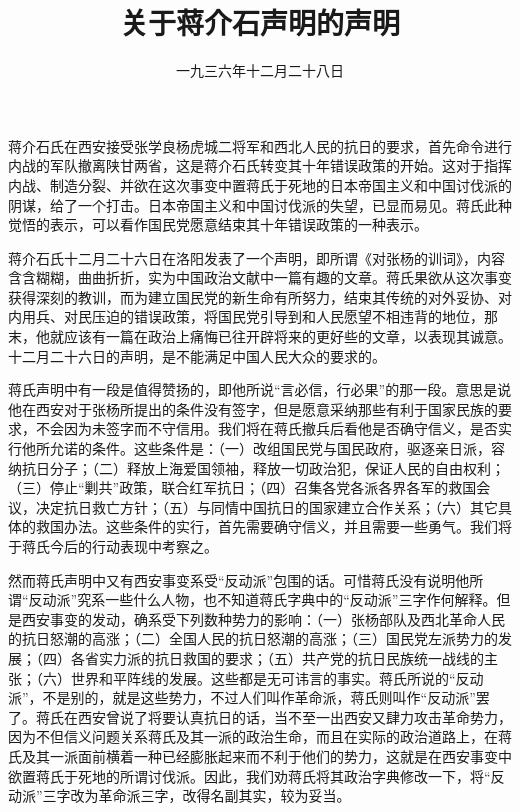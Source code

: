 
\title{关于蒋介石声明的声明}
\date{一九三六年十二月二十八日}
\maketitle


蒋介石氏在西安接受张学良杨虎城二将军和西北人民的抗日的要求，首先命令进行内战的军队撤离陕甘两省，这是蒋介石氏转变其十年错误政策的开始。这对于指挥内战、制造分裂、并欲在这次事变中置蒋氏于死地的日本帝国主义和中国讨伐派的阴谋，给了一个打击。日本帝国主义和中国讨伐派的失望，已显而易见。蒋氏此种觉悟的表示，可以看作国民党愿意结束其十年错误政策的一种表示。

蒋介石氏十二月二十六日在洛阳发表了一个声明，即所谓《对张杨的训词》，内容含含糊糊，曲曲折折，实为中国政治文献中一篇有趣的文章。蒋氏果欲从这次事变获得深刻的教训，而为建立国民党的新生命有所努力，结束其传统的对外妥协、对内用兵、对民压迫的错误政策，将国民党引导到和人民愿望不相违背的地位，那末，他就应该有一篇在政治上痛悔已往开辟将来的更好些的文章，以表现其诚意。十二月二十六日的声明，是不能满足中国人民大众的要求的。

蒋氏声明中有一段是值得赞扬的，即他所说“言必信，行必果”的那一段。意思是说他在西安对于张杨所提出的条件没有签字，但是愿意采纳那些有利于国家民族的要求，不会因为未签字而不守信用。我们将在蒋氏撤兵后看他是否确守信义，是否实行他所允诺的条件。这些条件是：（一）改组国民党与国民政府，驱逐亲日派，容纳抗日分子；（二）释放上海爱国领袖，释放一切政治犯，保证人民的自由权利；（三）停止“剿共”政策，联合红军抗日；（四）召集各党各派各界各军的救国会议，决定抗日救亡方针；（五）与同情中国抗日的国家建立合作关系；（六）其它具体的救国办法。这些条件的实行，首先需要确守信义，并且需要一些勇气。我们将于蒋氏今后的行动表现中考察之。

然而蒋氏声明中又有西安事变系受“反动派”包围的话。可惜蒋氏没有说明他所谓“反动派”究系一些什么人物，也不知道蒋氏字典中的“反动派”三字作何解释。但是西安事变的发动，确系受下列数种势力的影响：（一）张杨部队及西北革命人民的抗日怒潮的高涨；（二）全国人民的抗日怒潮的高涨；（三）国民党左派势力的发展；（四）各省实力派的抗日救国的要求；（五）共产党的抗日民族统一战线的主张；（六）世界和平阵线的发展。这些都是无可讳言的事实。蒋氏所说的“反动派”，不是别的，就是这些势力，不过人们叫作革命派，蒋氏则叫作“反动派”罢了。蒋氏在西安曾说了将要认真抗日的话，当不至一出西安又肆力攻击革命势力，因为不但信义问题关系蒋氏及其一派的政治生命，而且在实际的政治道路上，在蒋氏及其一派面前横着一种已经膨胀起来而不利于他们的势力，这就是在西安事变中欲置蒋氏于死地的所谓讨伐派。因此，我们劝蒋氏将其政治字典修改一下，将“反动派”三字改为革命派三字，改得名副其实，较为妥当。

